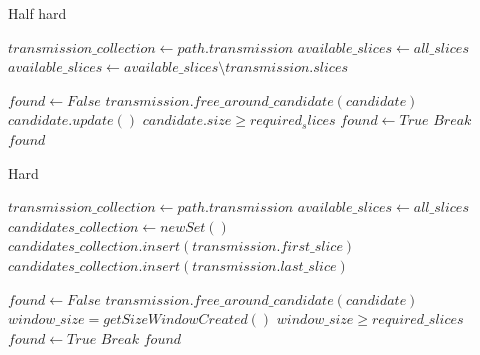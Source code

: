 \documentclass[11pt,a4paper]{article}
\begin{document}
\begin{algorithm}
\caption{Half hard}\label{half_hard}
\begin{algorithmic}[1]
	\State $transmission\_collection\gets path.transmission$
	\State $available\_slices\gets all\_slices$
      \State $available\_slices \gets available\_slices\setminus transmission.slices$
	\EndFor
	
	\State $found \gets False$
			\State $transmission.free\_around\_candidate(candidate)$
		\EndFor
		\State $candidate.update()$
		\If $candidate.size \geq required_slices$
			\State $found \gets True$
			\State $Break$
		\EndIf
	\EndFor
	\State \Return $found$
\EndProcedure
\end{algorithmic}
\end{algorithm}

\begin{algorithm}
\caption{Hard}\label{hard}
\begin{algorithmic}[1]
	\State $transmission\_collection\gets path.transmission$
	\State $available\_slices\gets all\_slices$
	\State $candidates\_collection\gets new Set()$
      \State $candidates\_collection.insert(transmission.first\_slice)$
      \State $candidates\_collection.insert(transmission.last\_slice)$
	\EndFor
	
	\State $found \gets False$
			\State $transmission.free\_around\_candidate(candidate)$
		\EndFor
		\State $window\_size=getSizeWindowCreated()$
		\If $window\_size \geq required\_slices$
			\State $found \gets True$
			\State $Break$
		\EndIf
	\EndFor
	\State \Return $found$
\EndProcedure
\end{algorithmic}
\end{algorithm}
\end{document}
